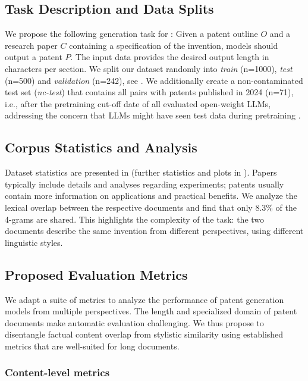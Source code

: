 \subsection{Task Description and Data Splits}
We propose the following generation task for \DatasetName: Given a patent outline $O$ and a research paper $C$
containing a specification of the invention, models should output a patent $P$. 
The input data provides the desired output length in characters per section.
We split our dataset randomly into \textit{train} (n=1000), \textit{test} (n=500) and \textit{validation} (n=242), see .
We additionally create a non-contaminated test set (\textit{nc-test}) that contains all pairs with patents published in 2024 (n=71), i.e., after the pretraining cut-off date of all evaluated open-weight LLMs, addressing the concern that LLMs might have seen test data during pretraining \cite{ravaut2024much}.


\subsection{Corpus Statistics and Analysis}
Dataset statistics are presented in  (further statistics and plots in ).
Papers typically include details and analyses regarding experiments;
patents usually contain more information on applications and practical benefits.
We analyze the lexical overlap between the respective documents and find that only 8.3\% of the 4-grams are shared.
This highlights the complexity of the task: 
the two documents describe the same invention from different perspectives, using different linguistic styles.



\subsection{Proposed Evaluation Metrics}\label{sec:new_metrics}

We adapt a suite of metrics to analyze the performance of patent generation models from multiple perspectives.
The length and specialized domain of patent documents make automatic evaluation challenging.
We thus propose to disentangle factual content overlap from stylistic similarity using established metrics that are well-suited for long documents. 

\subsubsection{Content-level metrics}


